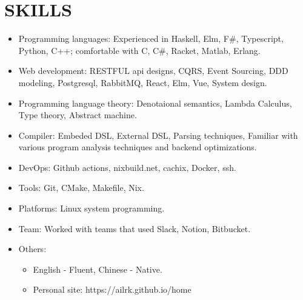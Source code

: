 \documentclass{resume}
\begin{document}
\section{SKILLS}
    \begin{itemize}


    \item Programming languages:
        Experienced in Haskell, Elm, F\#, Typescript, Python, C++; comfortable with C, C\#, Racket, Matlab, Erlang.

    \item Web development:
        RESTFUL api designs, CQRS, Event Sourcing, DDD modeling, Postgresql, RabbitMQ, React, Elm, Vue, System design.

    \item Programming language theory:
        Denotaional semantics, Lambda Calculus, Type theory, Abstract machine.

    \item Compiler:
        Embeded DSL, External DSL, Parsing techniques, Familiar with various program analysis techniques and backend optimizations.

    \item DevOps:
        Github actions, nixbuild.net, cachix, Docker, ssh.

    \item Tools: Git, CMake, Makefile, Nix.

    \item Platforms: Linux system programming.

    \item Team: Worked with teams that used Slack, Notion, Bitbucket.

    \item Others:
        \begin{itemize}
            \item English - Fluent, Chinese - Native.
            \item Personal site: https://ailrk.github.io/home
        \end{itemize}

    \end{itemize}
\end{document}

